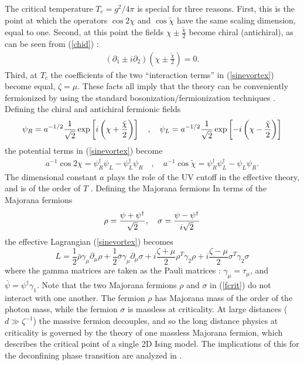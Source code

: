 \documentclass[a4paper,aps,prd,superscriptaddress,showpacs,showkeys]{revtex4}
\begin{document}
The critical temperature $T_c=g^2/4\pi$
is special for three reasons. First, this is the point at which the
operators $\cos 2\chi$ and $\cos \tilde{\chi}$ have the same scaling
dimension, equal to one. Second, at this point the fields
$\chi\pm\frac{\tilde{\chi}}{2}$ become chiral (antichiral), as can be
seen from (\ref{chid}) :
\begin{eqnarray}
(\partial_1\pm i\partial_2)\left(\chi\pm \frac{\tilde{\chi}}{2}\right)=0.
\label{chiral}
\end{eqnarray}
Third, at
$T_c$ the coefficients of the two ``interaction terms'' in
(\ref{sinevortex}) become equal, $\zeta=\mu$. These facts all imply that
the theory can be conveniently fermionized by using
the standard bosonization/fermionization techniques \cite{Nersesyan}.
Defining the chiral and antichiral fermionic fields
\begin{equation}
\psi_{R}=a^{-1/2}\frac{1}{\sqrt{2}}\exp\left[ i\left(\chi+
{\tilde\chi\over 2}\right)\right]\quad ,\quad
\psi_{L}=a^{-1/2}\frac{1}{\sqrt{2}}\exp\left[- i\left(\chi-
{\tilde\chi\over 2}\right)\right]
\end{equation}
the potential terms in (\ref{sinevortex}) become
\begin{eqnarray}
a^{-1}\cos 2\chi=\psi_R^\dagger\psi_L -\psi_L^\dagger\psi_R\quad
,\quad 
a^{-1}\cos\tilde\chi=\psi_R^\dagger\psi^\dagger_L-\psi_L\psi_R.
\end{eqnarray}
The dimensional constant $a$ plays the role of the UV cutoff in
the effective theory, and is of the order of $T$ \cite{zarembo}.
Defining the Majorana fermions In terms of the Majorana fermions
\begin{eqnarray}
\rho={\psi+\psi^\dagger\over \sqrt 2}, \ \ \
\sigma={\psi-\psi^\dagger\over i \sqrt 2}
\end{eqnarray}
the effective Lagrangian (\ref{sinevortex}) becomes
\begin{equation}
L=\frac12\bar\rho\gamma_\mu\partial_\mu\rho+
\frac12 \bar\sigma\gamma_\mu\partial_\mu\sigma+
i\frac{\zeta+\mu}{2}\rho^T \gamma_2 \rho+
i\frac{\zeta-\mu}{2}\sigma^T\gamma_2\sigma
\label{fcrit}
\end{equation}
where the gamma matrices are taken as the
Pauli matrices : $\gamma_\mu=\tau_\mu$, and
$\bar{\psi}=\psi^\dagger \gamma_1$. Note that the
two Majorana fermions $\rho$ and $\sigma$ in (\ref{fcrit}) do not
interact with one another. The fermion $\rho$ has
Majorana mass of the order of the photon mass, while the fermion
$\sigma$ is
massless at criticality. At large distances ($d\gg \zeta^{-1}$) the
massive fermion decouples,  and so the long distance physics at
criticality  is governed by the theory of one
massless Majorana fermion, which describes the critical point of a single
2D Ising model. The implications of this for the deconfining phase
transition are analyzed in
\cite{gg1}.
\end{document}
